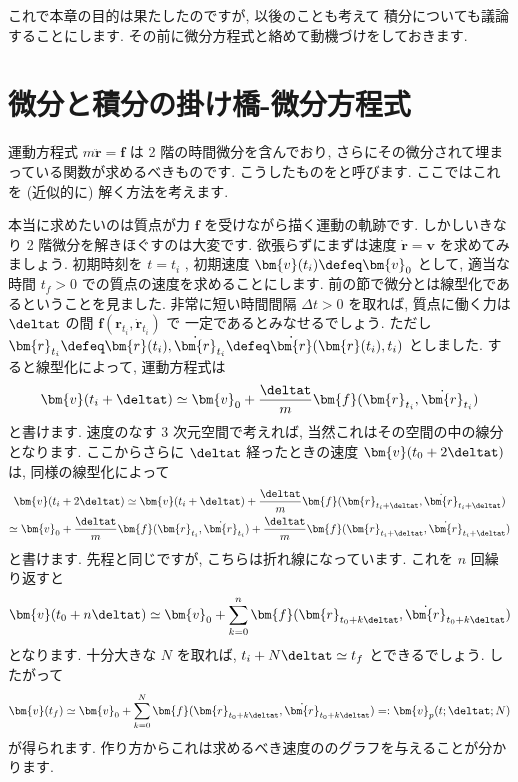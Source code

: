 \documentclass[openany, a4paper, oneside]{jsbook}
\begin{document}
これで本章の目的は果たしたのですが, 以後のことも考えて
積分についても議論することにします.
その前に微分方程式と絡めて動機づけをしておきます.
\section{微分と積分の掛け橋-微分方程式\label{sec:微分と積分の掛け橋}}

運動方程式 $m \ddot{ \bm{r} } = \bm{f}$ は 2 階の時間微分を含んでおり,
さらにその微分されて埋まっている関数が求めるべきものです.
こうしたものをと呼びます.
ここではこれを (近似的に) 解く方法を考えます.

本当に求めたいのは質点が力 $\bm{f}$ を受けながら描く運動の軌跡です.
しかしいきなり 2 階微分を解きほぐすのは大変です.
欲張らずにまずは速度 $\dot{ \bm{r} } = \bm{v}$ を求めてみましょう.
初期時刻を $t = t_i$ , 初期速度 $\bm{v} ( t_i ) \defeq \bm{v}_0$ として,
適当な時間 $t_f>0$ での質点の速度を求めることにします.
前の節で微分とは線型化であるということを見ました.
非常に短い時間間隔 $\varDelta t >0$ を取れば, 質点に働く力は
$\deltat$ の間 $\bm{f} ( \bm{r}_{ t_i } , \dot{ \bm{r} }_{t_i} )$ で
一定であるとみなせるでしょう.
ただし $\bm{r}_{t_i} \defeq \bm{r} (t_i) , \dot{ \bm{r} }_{t_i} \defeq \dot{ \bm{r} } ( \bm{r} ( t_i ) , t_i )$
としました.
すると線型化によって, 運動方程式は
\begin{gather}
\bm{v} ( t_i + \deltat )
\simeq
\bm{v}_0 + \frac{\deltat} {m} \bm{f} ( \bm{r}_{ t_i } , \dot{ \bm{r} }_{t_i} )
\end{gather}
と書けます.
速度のなす 3 次元空間で考えれば, 当然これはその空間の中の線分となります.
ここからさらに $\deltat$ 経ったときの速度 $\bm{v} (t_0 + 2 \deltat)$ は,
同様の線型化によって
\begin{gather}
\bm{v} ( t_i + 2 \deltat )
\simeq
\bm{v} ( t_i + \deltat ) + \frac{\deltat} {m} \bm{f} ( \bm{r}_{ t_i + \deltat } , \dot{ \bm{r} }_{t_i + \deltat} )\\
\simeq
\bm{v}_0 + \frac{\deltat} {m} \bm{f} ( \bm{r}_{ t_i } , \dot{ \bm{r} }_{t_i} )
+\frac{\deltat} {m} \bm{f} ( \bm{r}_{ t_i + \deltat } , \dot{ \bm{r} }_{t_i + \deltat} )
\end{gather}
と書けます.
先程と同じですが, こちらは折れ線になっています.
これを $n$ 回繰り返すと
\begin{gather}
\bm{v} ( t_0 + n \deltat )
\simeq
\bm{v}_0 + \sum_{k=0}^n \bm{f} ( \bm{r}_{ t_0 + k \deltat } , \dot{ \bm{r} }_{t_0 + k \deltat} )
\end{gather}
となります.
十分大きな $N$ を取れば,  $t_i + N \deltat \simeq t_f$ とできるでしょう.
したがって
\begin{gather}
\bm{v} ( t_f )
\simeq
\bm{v}_0 + \sum_{k=0}^N \bm{f} ( \bm{r}_{ t_0 + k \deltat } , \dot{ \bm{r} }_{t_0 + k \deltat} )
=:
\bm{v}_p ( t ; \deltat ; N )
\end{gather}
が得られます.
作り方からこれは求めるべき速度ののグラフを与えることが分かります.
\end{document}
